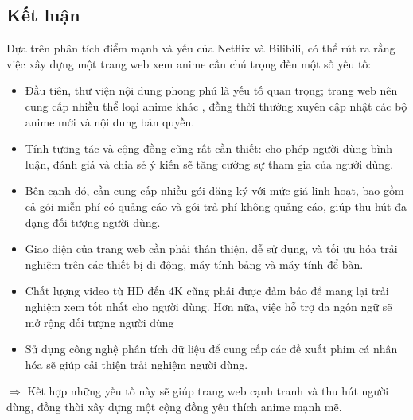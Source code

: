 \pagebreak
\subsection{Kết luận}

Dựa trên phân tích điểm mạnh và yếu của Netflix và Bilibili, có thể rút ra rằng việc xây dựng một trang web xem anime cần chú trọng đến một số yếu tố:

\begin{itemize}
\item  Đầu tiên, thư viện nội dung phong phú là yếu tố quan trọng; trang web nên cung cấp nhiều thể loại anime khác , đồng thời thường xuyên cập nhật các bộ anime mới và nội dung bản quyền. 
\item Tính tương tác và cộng đồng cũng rất cần thiết: cho phép người dùng bình luận, đánh giá và chia sẻ ý kiến sẽ tăng cường sự tham gia của người dùng. 
\item Bên cạnh đó, cần cung cấp nhiều gói đăng ký với mức giá linh hoạt, bao gồm cả gói miễn phí có quảng cáo và gói trả phí không quảng cáo, giúp thu hút đa dạng đối tượng người dùng. 
\item Giao diện của trang web cần phải thân thiện, dễ sử dụng, và tối ưu hóa trải nghiệm trên các thiết bị di động, máy tính bảng và máy tính để bàn.
\item Chất lượng video từ HD đến 4K cũng phải được đảm bảo để mang lại trải nghiệm xem tốt nhất cho người dùng. Hơn nữa, việc hỗ trợ đa ngôn ngữ sẽ mở rộng đối tượng người dùng
\item Sử dụng công nghệ phân tích dữ liệu để cung cấp các đề xuất phim cá nhân hóa sẽ giúp cải thiện trải nghiệm người dùng. 
\end{itemize}

$\Rightarrow$ Kết hợp những yếu tố này sẽ giúp trang web cạnh tranh và thu hút người dùng, đồng thời xây dựng một cộng đồng yêu thích anime mạnh mẽ.

\pagebreak


